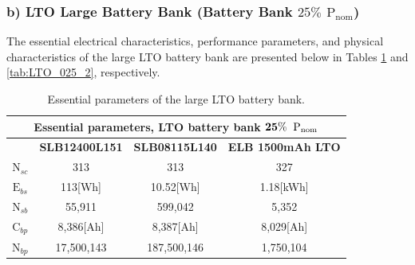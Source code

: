  
		


\subsubsection{b) LTO Large Battery Bank (Battery Bank $25\%$ ${\text{P}}_{\text{nom}}$)}

The essential electrical characteristics, performance parameters, and physical characteristics of the large LTO battery bank are presented below in Tables \ref{tab:LTO_025_1} and \ref{tab:LTO_025_2}, respectively.

\begin{table}[H]
	\centering
	\caption{Essential parameters of the large LTO battery bank.}
	\label{tab:LTO_025_1}
	\begin{tabular}{|c|c|c|c|}
		\hline
		\multicolumn{4}{|c|}{\textbf{Essential parameters, LTO battery bank} $\bf 25\%$ ${\bf \text{P}}_{\bf \text{nom}}$} \\
		\hline\hline
		 &  \textbf{SLB12400L151} & \textbf{SLB08115L140} & \textbf{ELB 1500mAh LTO}\\
		 \hline
		$\text{N}_{sc}$ & 313 & 313 & 327 \\	
		\hline
		$\text{E}_{bs}$ & 113[Wh] & 10.52[Wh] & 1.18[kWh]\\	
		\hline
		$\text{N}_{sb}$ & 55,911 & 599,042 & 5,352\\	
		\hline
		$\text{C}_{bp}$ & 8,386[Ah]& 8,387[Ah] & 8,029[Ah]\\	
		\hline 
		$\text{N}_{bp}$ & 17,500,143 & 187,500,146 & 1,750,104  \\	
		\hline		
	\end{tabular}
\end{table}

